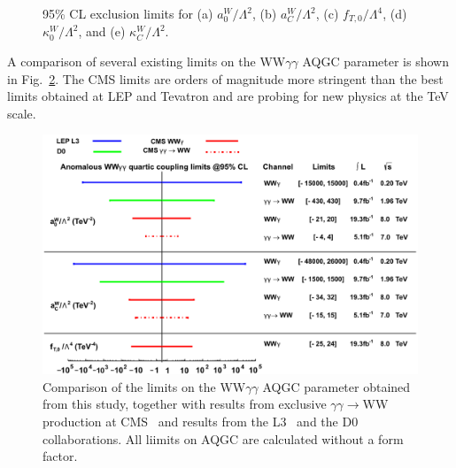 \begin{figure}[hb]
\begin{center}
{  } %
    \caption{ 95\% CL exclusion limits for (a) $a_{0}^{W}/\Lambda^{2}$, (b) $a_{C}^{W}/\Lambda^{2}$, (c) $f_{T,0}/\Lambda^{4}$, (d) 
$\kappa_{0}^{W}/\Lambda^{2}$, and (e) $\kappa_{C}^{W}/\Lambda^{2}$.}
    \label{fig:limitshape1d_noMVA}
  \end{center} \end{figure}

A comparison of several existing limits on the WW$\gamma\gamma$ AQGC parameter is shown in Fig.~\ref{fig:WWAAcomparison}. The CMS 
limits are orders of magnitude more stringent than the best limits obtained at LEP and Tevatron and are probing for new physics at the TeV scale.

\begin{figure}[htb] \begin{center}
   \includegraphics[width=.98\textwidth]{figs/WWaa_comparison.pdf} 
   \caption{ Comparison of the limits on the WW$\gamma\gamma$ AQGC parameter obtained
from this study, together with results from exclusive $\gamma\gamma\rightarrow$WW production at CMS~\cite{Chatrchyan:2013foa} and results from the 
L3~\cite{Achard:2001eg} and the D0~\cite{Abazov:2013opa} collaborations. All liimits on AQGC are calculated without a form 
factor. } 
\label{fig:WWAAcomparison} 
\end{center} 
\end{figure}

